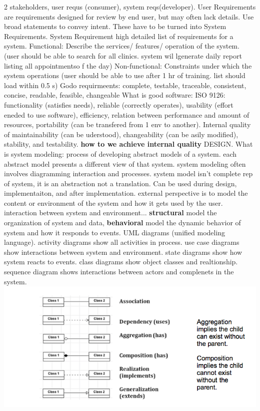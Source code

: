 \documentclass[10pt]{article}
\begin{document}
\begin{landscape}
\begin{multicols*}{6}
2 stakeholders, user requs (consumer), system reqs(developer). User Requirements are requirements designed
for review by end user, but may often lack details. Use broad statements to convey intent. These have to be turned into System Requirements. System Requirement high detailed list of requirements for a system.
Functional: Describe the services/ features/ operation of the system. (user should be able to search for all clinics. system wil lgenerate daily report listing all appointmentso f the day)
Non-functional: Constraints under which the system operations (user should be able to use after 1 hr of training. list should load within 0.5 s)
Godo requirmeents: complete, testable, traceable, consistent, concise, readable, feasible, changeable
What is good software: ISO 9126: functionality (satisfies needs), reliable (correctly operates), usability (effort eneded to use software), efficiency, relation between performance and amount of resources, portability (can be transfered from 1 env to another). Internal quality of maintainability (can be uderstood), changeability (can be asily modified), stability, and testability. \textbf{how to we achieve internal quality} DESIGN.
What is system modeling: process of developing abstract models of a system. each abstract model presents a different view of that system. system modeling often involves diagramming interaction and processes. system model isn't complete rep of system, it is an abstraction not a translation. Can be used during design, implementaiton, and after implementation. external perspective is to model the content or environment of the system and how it gets used by the user. interaction between system and environment... \textbf{structural} model the organization of system and data, \textbf{behavioral} model the dynamic behavior of system and how it responds to events.
UML diagrams (unified modeling language). activity diagrams show all activities in process. use case diagrams show interactions between system and environment. state diagrams show how system reacts to events. class diagrams show object classes and realtionship. sequence diagram shows interactions between actors and complenets in the system. \includegraphics[width=\columnwidth]{uml}

\end{multicols*}
\end{landscape}
\end{document}
